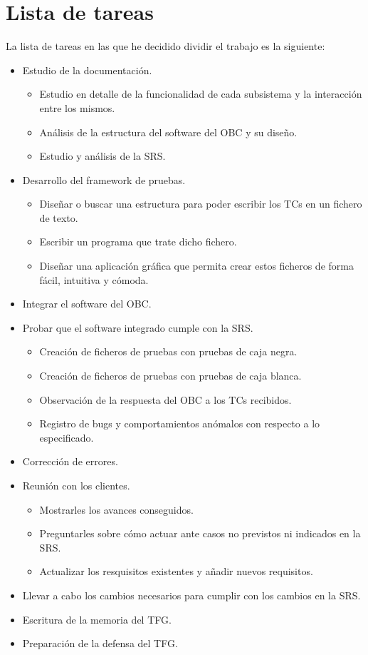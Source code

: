 
\section{Lista de tareas}
La lista de tareas en las que he decidido dividir el trabajo es la siguiente:
\begin{itemize}
  \itemsep0em
\item Estudio de la documentación.
  \begin{itemize}
    \itemsep0em
  \item Estudio en detalle de la funcionalidad de cada subsistema y la
    interacción entre los mismos.
  \item Análisis de la estructura del software del OBC y su diseño.
  \item Estudio y análisis de la SRS.
  \end{itemize}

\item Desarrollo del framework de pruebas.
  \begin{itemize}
    \itemsep0em
  \item Diseñar o buscar una estructura para poder escribir los TCs en un
    fichero de texto.
  \item Escribir un programa que trate dicho fichero.
  \item Diseñar una aplicación gráfica que permita crear estos ficheros de
    forma fácil, intuitiva y cómoda.
  \end{itemize}

\item Integrar el software del OBC.

\item Probar que el software integrado cumple con la SRS.
  \begin{itemize}
    \itemsep0em
  \item Creación de ficheros de pruebas con pruebas de caja negra.
  \item Creación de ficheros de pruebas con pruebas de caja blanca.
  \item Observación de la respuesta del OBC a los TCs recibidos.
  \item Registro de bugs y comportamientos anómalos con respecto a lo
    especificado.
  \end{itemize}

\item Corrección de errores.  
  
\item Reunión con los clientes.
  \begin{itemize}
    \itemsep0em
  \item Mostrarles los avances conseguidos.
  \item Preguntarles sobre cómo actuar ante casos no previstos ni indicados
    en la SRS.
  \item Actualizar los resquisitos existentes y añadir nuevos requisitos.
  \end{itemize}

\item Llevar a cabo los cambios necesarios para cumplir con los cambios en la
  SRS.

\item Escritura de la memoria del TFG.
\item Preparación de la defensa del TFG.
  
\end{itemize}

